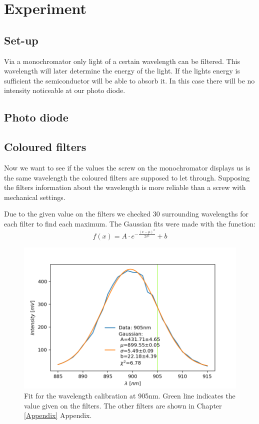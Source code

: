 \documentclass[]{article}
\begin{document}
\section{Experiment}
\subsection{Set-up}

Via a monochromator only light of a certain wavelength can be filtered. This wavelength will later determine the energy of the light. If the lights energy is sufficient the semiconductor will be able to absorb it. In this case there will be no intensity noticeable at our photo diode. 



\subsection{Photo diode}
\subsection{Coloured filters} \label{color filters}
Now we want to see if the values the screw on the monochromator displays us is the same wavelength the coloured filters are supposed to let through. Supposing the filters information about the wavelength is more reliable than a screw with mechanical settings.

Due to the given value on the filters we checked 30 surrounding wavelengths for each filter to find each maximum. The Gaussian fits were made with the function:
\begin{equation}
f(x) = A \cdot e^{-\frac{(x-\mu)^2}{2 \sigma^2}} + b
\end{equation}

\begin{figure}[H]
\centering
\includegraphics[width=.9\textwidth]{Plots/905nm-Filter.png}
\caption{Fit for the wavelength calibration at 905nm. Green line indicates the value given on the filters. The other filters are shown in Chapter \ref{Appendix} Appendix.}
\end{figure}
\end{document}
